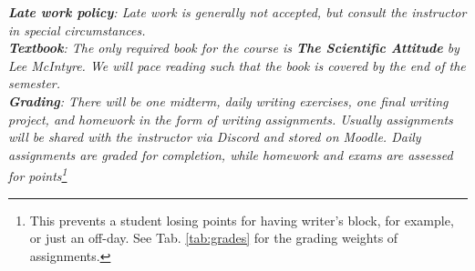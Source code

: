 \documentclass[10pt]{article}
\begin{document}
\textit{\textbf{Late work policy}: Late work is generally not accepted, but consult the instructor in special circumstances.} \\
\textit{\textbf{Textbook}: The only required book for the course is \textit{\textbf{The Scientific Attitude} by Lee McIntyre}.  We will pace reading such that the book is covered by the end of the semester.} \\
\textit{\textbf{Grading}: There will be one midterm, daily writing exercises, one final writing project, and homework in the form of writing assignments.  Usually assignments will be shared with the instructor via Discord and stored on Moodle.  Daily assignments are graded for completion, while homework and exams are assessed for points\footnote{This prevents a student losing points for having writer's block, for example, or just an off-day.  See Tab. \ref{tab:grades} for the grading weights of assignments.}}
\end{document}
